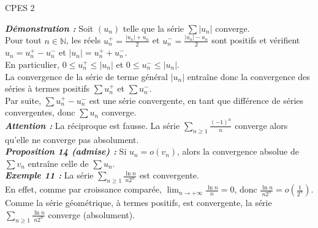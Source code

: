 \documentclass[10pt,a4paper]{article}
\begin{document}
\hfill{\footnotesize CPES 2}
\vspace{0.2cm}

\noindent
\begin{minipage}[t]{0.48\textwidth}
\textit{\textbf{Démonstration :}} Soit $(u_n)$ telle que la série $\sum |u_n|$ converge.\\[0.15cm]
Pour tout $n \in \mathbb{N}$, les réels $u_n^+ = \frac{|u_n| + u_n}{2}$ et $u_n^- = \frac{|u_n| - u_n}{2}$ sont positifs et vérifient $u_n = u_n^+ - u_n^-$ et $|u_n| = u_n^+ + u_n^-$.\\[0.15cm]
En particulier, $0 \le u_n^+ \le |u_n|$ et $0 \le u_n^- \le |u_n|$.\\[0.15cm]
La convergence de la série de terme général $|u_n|$ entraîne donc la convergence des séries à termes positifs $\sum u_n^+$ et $\sum u_n^-$.\\[0.15cm]
Par suite, $\sum u_n^+ - u_n^-$ est une série convergente, en tant que différence de séries convergentes, donc $\sum u_n$ converge.\\[0.3cm]
\textit{\textbf{Attention :}} La réciproque est fausse. La série $\sum_{n \ge 1} \frac{(-1)^n}{n}$ converge alors qu'elle ne converge pas absolument.\\[0.3cm]
\textit{\textbf{Proposition 14 (admise) :}} Si $u_n = o(v_n)$, alors la convergence absolue de $\sum v_n$ entraîne celle de $\sum u_n$.\\[0.3cm]
\textit{\textbf{Exemple 11 :}} La série $\sum_{n \ge 1} \frac{\ln n}{n 2^n}$ est convergente.\\[0.15cm]
En effet, comme par croissance comparée, $\lim_{n \to +\infty} \frac{\ln n}{n} = 0$, donc $\frac{\ln n}{n 2^n} = o\left(\frac{1}{2^n}\right)$.\\[0.15cm]
Comme la série géométrique, à termes positifs, est convergente, la série $\sum_{n \ge 1} \frac{\ln n}{n 2^n}$ converge (absolument).
\end{minipage}%
\hfill
\end{document}
